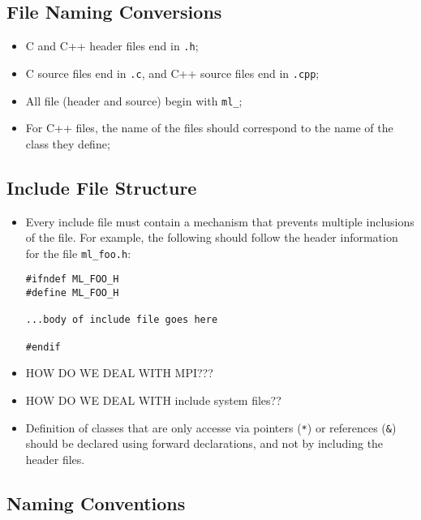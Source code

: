 \documentclass[10pt,letter,relax]{SANDreport}
\begin{document}
\subsection{File Naming Conversions}

\begin{itemize}
\item C and C++ header files end in \verb!.h!;
\item C source files end in \verb!.c!, and C++ source files end in
\verb!.cpp!;
\item All file (header and source) begin with \verb!ml_!;
\item For C++ files, the name of the files should correspond to the name of
the class they define;
\end{itemize}

\subsection{Include File Structure}

\begin{itemize}
\item Every include file must contain a mechanism that prevents multiple
inclusions of the file. For example, the following should follow the header
information for the file \verb!ml_foo.h!:
\begin{verbatim}
#ifndef ML_FOO_H
#define ML_FOO_H

...body of include file goes here

#endif
\end{verbatim}
\item HOW DO WE DEAL WITH MPI???
\item HOW DO WE DEAL WITH include system files??
\item Definition of classes that are only accesse via pointers (\verb!*!) or
references (\verb!&!) should be declared using forward declarations, and not by
including the header files.
\end{itemize}

\subsection{Naming Conventions}
\end{document}
